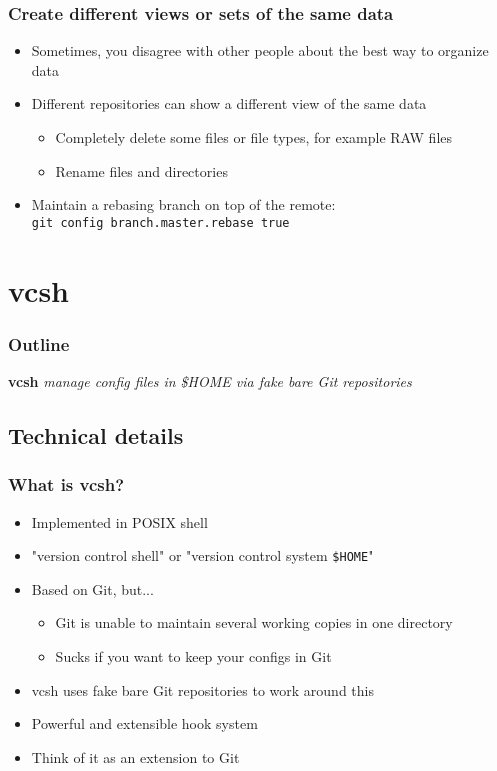 \documentclass[t]{beamer}
\begin{document}
\begin{frame}
	\frametitle{Create different views or sets of the same data}
	\begin{itemize}
		\item Sometimes, you disagree with other people about the best way to organize data
		\item Different repositories can show a different view of the same data
			\begin{itemize}
				\item Completely delete some files or file types, for example RAW files
				\item Rename files and directories
			\end{itemize}
		\item Maintain a rebasing branch on top of the remote: \\
			\texttt{git config branch.master.rebase true}
	\end{itemize}
\end{frame}


\section{vcsh}

\begin{frame}
	\frametitle{Outline}
	\tableofcontents[currentsection]
\end{frame}

\begin{frame}
		\begin{center}
			\vfill
			\vfill
			\textbf{vcsh}
			\vfill
			\textit{manage config files in \$HOME via fake bare Git repositories}
			\vfill
			\vfill
		\end{center}
\end{frame}

\subsection{Technical details}

\begin{frame}
	\frametitle{What is vcsh?}
	\begin{itemize}
		\item Implemented in POSIX shell
		\item "version control shell" or "version control system \texttt{\$HOME}"
		\item Based on Git, but...
		\begin{itemize}
			\item Git is unable to maintain several working copies in one directory
			\item Sucks if you want to keep your configs in Git
		\end{itemize}
		\item vcsh uses fake bare Git repositories to work around this
		\item Powerful and extensible hook system
		\item Think of it as an extension to Git
	\end{itemize}
\end{frame}
\end{document}
